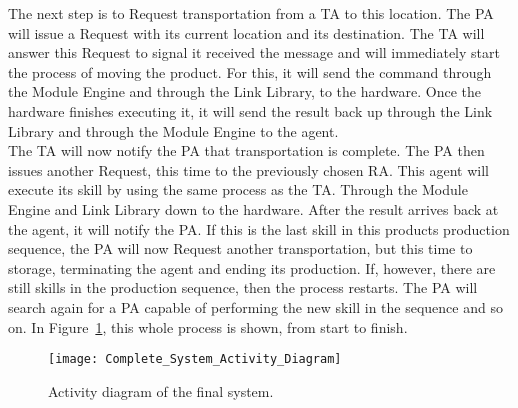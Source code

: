 The next step is to Request transportation from a \acrshort{TA} to this location. The \acrshort{PA} will issue a Request with its current location and its destination. The \acrshort{TA} will answer this Request to signal it received the message and will immediately start the process of moving the product. For this, it will send the command through the Module Engine and through the Link Library, to the hardware. Once the hardware finishes executing it, it will send the result back up through the Link Library and through the Module Engine to the agent.\\

The \acrshort{TA} will now notify the \acrshort{PA} that transportation is complete. The \acrshort{PA} then issues another Request, this time to the previously chosen \acrshort{RA}. This agent will execute its skill by using the same process as the \acrshort{TA}. Through the Module Engine and Link Library down to the hardware. After the result arrives back at the agent, it will notify the \acrshort{PA}. If this is the last skill in this products production sequence, the \acrshort{PA} will now Request another transportation, but this time to storage, terminating the agent and ending its production. If, however, there are still skills in the production sequence, then the process restarts. The \acrshort{PA} will search again for a \acrshort{PA} capable of performing the new skill in the sequence and so on. In Figure~\ref{fig:complete_activity_diagram}, this whole process is shown, from start to finish.\\

\begin{figure}[h!]
	\centering
	\texttt{[image: Complete\_System\_Activity\_Diagram]}
	\caption{Activity diagram of the final system.}
	\label{fig:complete_activity_diagram}
\end{figure}
